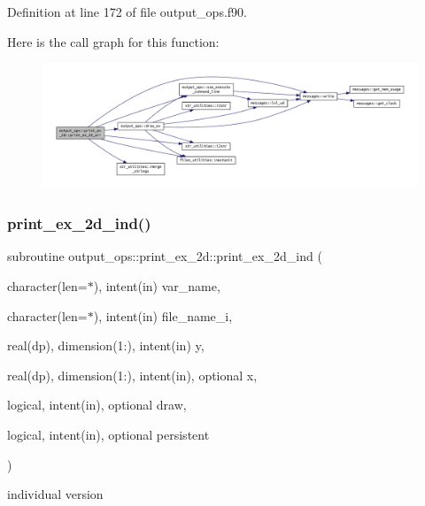 Definition at line 172 of file output\+\_\+ops.\+f90.

Here is the call graph for this function\+:\nopagebreak
\begin{figure}[H]
\begin{center}
\leavevmode
\includegraphics[width=350pt]{interfaceoutput__ops_1_1print__ex__2d_ade45a02083c437f9264ed1500b1d1ea0_cgraph}
\end{center}
\end{figure}
\mbox{\label{interfaceoutput__ops_1_1print__ex__2d_a72cb1fa0be48a610a27db6faba576b6c}} 
\subsubsection{\texorpdfstring{print\+\_\+ex\+\_\+2d\+\_\+ind()}{print\_ex\_2d\_ind()}}
{\footnotesize\ttfamily subroutine output\+\_\+ops\+::print\+\_\+ex\+\_\+2d\+::print\+\_\+ex\+\_\+2d\+\_\+ind (\begin{DoxyParamCaption}\item[{character(len=$\ast$), intent(in)}]{var\+\_\+name,  }\item[{character(len=$\ast$), intent(in)}]{file\+\_\+name\+\_\+i,  }\item[{real(dp), dimension(1\+:), intent(in)}]{y,  }\item[{real(dp), dimension(1\+:), intent(in), optional}]{x,  }\item[{logical, intent(in), optional}]{draw,  }\item[{logical, intent(in), optional}]{persistent }\end{DoxyParamCaption})}



individual version 


